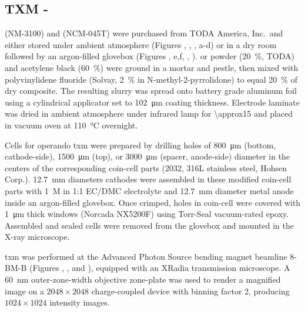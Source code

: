 \documentclass{article}
\begin{document}
\subsection*{TXM - \nmc{}}

\nmc[333]{} (NM-3100) and \nmc[532]{} (NCM-045T) were purchased from
TODA America, Inc.\ and either stored under ambient atmosphere
(Figures , ,
, a-d) or
in a dry room followed by an argon-filled glovebox (Figures
, e,f,
,
). \nca{} or \nmc{} powder
(\SI{20}{\percent}, TODA) and acetylene black (\SI{60}{\percent}) were
ground in a mortar and pestle, then mixed with polyvinylidene fluoride
(Solvay, \SI{2}{\percent} in N-methyl-2-pyrrolidone) to equal
\SI{20}{\percent} of dry composite. The resulting slurry was spread
onto battery grade aluminum foil using a cylindrical applicator set to
\SI{102}{\micro\meter} coating thickness. Electrode laminate was dried
in ambient atmosphere under infrared lamp for \SI{\approx15}{\min} and
placed in vacuum oven at \SI{110}{\celsius} overnight.

Cells for operando \gls{txm} were prepared by drilling holes of
\SI{800}{\micro\meter} (bottom, cathode-side), \SI{1500}{\micro\meter}
(top), or \SI{3000}{\micro\meter} (spacer, anode-side) diameter in the
centers of the corresponding coin-cell parts (2032, 316L stainless
steel, Hohsen Corp.). \SI{12.7}{\milli\meter} diameters cathodes were
assembled in these modified coin-cell parts with \SI{1}{M} 
in 1:1 EC/DMC electrolyte and \SI{12.7}{\milli\meter} diameter 
metal anode inside an argon-filled glovebox. Once crimped, holes in
coin-cell were covered with \SI{1}{\micro\meter} thick 
windows (Norcada NX5200F) using Torr-Seal vacuum-rated
epoxy. Assembled and sealed cells were removed from the glovebox and
mounted in the X-ray microscope.

\gls{txm} was performed at the Advanced Photon Source bending magnet
beamline 8-BM-B (Figures ,
, and ),
equipped with an XRadia transmission microscope. A \SI{60}{nm}
outer-zone-width objective zone-plate was used to render a magnified
image on a $2048 \times 2048$ charge-coupled device with binning
factor 2, producing $1024 \times 1024$ intensity images.
\end{document}
